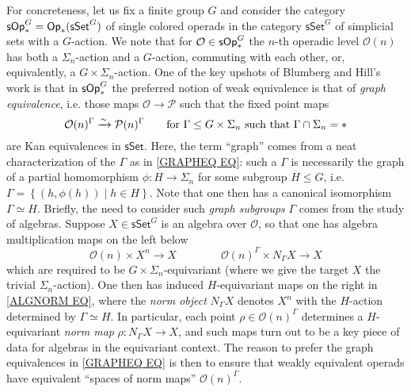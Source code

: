 \documentclass[a4paper,10pt
,draft
]{article}%
\numberwithin{equation}{section}
\numberwithin{figure}{section}
\theoremstyle{definition} %
\newcommand{\sets}[2]{\left\{ #1 \;|\; #2\right\}}%
\renewcommand{\O}{\ensuremath{\mathcal O}}
\newcommand{\1}{\ensuremath{\mathbbm 1}}%
\begin{document}
For concreteness, let us fix a finite group $G$
and consider the category
$\mathsf{sOp}^{G}_{\**} = 
\mathsf{Op}_{\**}(\mathsf{sSet}^G)$
of single colored operads 
in the category
$\mathsf{sSet}^G$
of simplicial sets with a $G$-action.
We note that for $\O \in \mathsf{sOp}^{G}_{\**}$
the $n$-th operadic level $\O(n)$ has both a $\Sigma_n$-action and a $G$-action, commuting with each other, or, equivalently, 
a $G \times \Sigma_n$-action.
One of the key upshots
of Blumberg and Hill's work \cite{BH15}
is that in $\mathsf{sOp}^{G}_{\**}$
the preferred notion of weak equivalence is that of \emph{graph equivalence},
i.e. those maps 
$\O \to \mathcal{P}$
such that the fixed point maps
\begin{equation}\label{GRAPHEQ EQ}
\O(n)^{\Gamma} \xrightarrow{\sim} \mathcal{P}(n)^{\Gamma}
\qquad
\text{for }
\Gamma \leq G \times \Sigma_n
\text{ such that }
\Gamma \cap \Sigma_n = \**
\end{equation}
are Kan equivalences in $\mathsf{sSet}$.
%
Here, the term ``graph'' comes from a neat characterization of the $\Gamma$
as in \eqref{GRAPHEQ EQ}:
such a $\Gamma$ is necessarily the graph of a partial homomorphism
$\phi \colon H \to \Sigma_n$ for some subgroup $H \leq G$,
i.e.
$\Gamma = \sets{(h,\phi(h))}{h \in H}$. 
Note that one then has a canonical isomorphism $\Gamma \simeq H$.
%
Briefly, the need to consider such \emph{graph subgroups} $\Gamma$ comes from the study of algebras.
Suppose $X \in \mathsf{sSet}^G$ is an algebra over
$\O$,
so that one has algebra multiplication maps
on the left below
\begin{equation}\label{ALGNORM EQ}
\O(n) \times X^n \to X
\qquad \qquad
\O(n)^{\Gamma} \times N_{\Gamma}X \to X
\end{equation}
which are required to be 
$G \times \Sigma_n$-equivariant
(where we give the target $X$ the trivial $\Sigma_n$-action).
One then has induced 
$H$-equivariant maps 
on the right in \eqref{ALGNORM EQ},
where the \emph{norm object} $N_{\Gamma} X$
denotes $X^{n}$ with the $H$-action determined by $\Gamma \simeq H$.
In particular, each point
$\rho \in \O(n)^{\Gamma}$
determines a $H$-equivariant \emph{norm map}
$\rho \colon N_{\Gamma} X \to X$,  
and such maps turn out to be a key piece of data
for algebras in the equivariant context.
The reason to prefer the graph equivalences in \eqref{GRAPHEQ EQ}
is then to ensure that weakly equivalent operads
have equivalent ``spaces of norm maps'' $\O(n)^{\Gamma}$.
\end{document}

